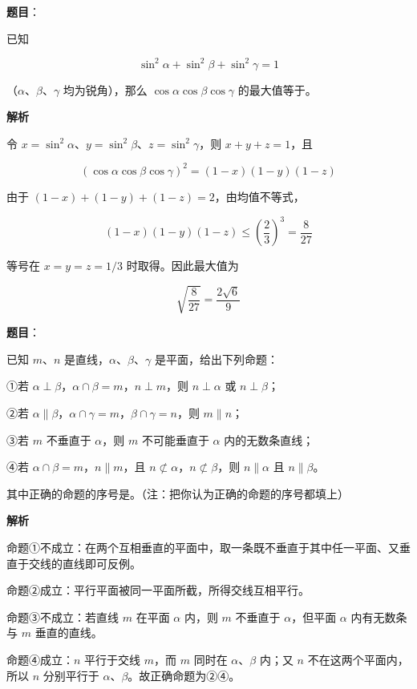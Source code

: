\begin{answer}

\textbf{题目}：

已知

\nopagebreak[4]
\[
\sin^2\alpha+\sin^2\beta+\sin^2\gamma=1
\]

（$\alpha\text{、}\beta\text{、}\gamma$ 均为锐角），那么 $\cos\alpha\cos\beta\cos\gamma$ 的最大值等于\gkblank{}。

\textbf{解析}

令 $x=\sin^2\alpha$、$y=\sin^2\beta$、$z=\sin^2\gamma$，则 $x+y+z=1$，且

\nopagebreak[4]
\[
(\cos\alpha\cos\beta\cos\gamma)^2=(1-x)(1-y)(1-z)
\]

由于 $(1-x)+(1-y)+(1-z)=2$，由均值不等式，

\nopagebreak[4]
\[
(1-x)(1-y)(1-z)\le\left(\frac23\right)^3=\frac8{27}
\]

等号在 $x=y=z=1/3$ 时取得。因此最大值为

\nopagebreak[4]
\[
\sqrt{\frac8{27}}=\frac{2\sqrt6}{9}
\]


\end{answer}
\begin{answer}

\textbf{题目}：

已知 $m\text{、}n$ 是直线，$\alpha\text{、}\beta\text{、}\gamma$ 是平面，给出下列命题：

①若 $\alpha\perp\beta$，$\alpha\cap\beta=m$，$n\perp m$，则 $n\perp\alpha$ 或 $n\perp\beta$；

②若 $\alpha\parallel\beta$，$\alpha\cap\gamma=m$，$\beta\cap\gamma=n$，则 $m\parallel n$；

③若 $m$ 不垂直于 $\alpha$，则 $m$ 不可能垂直于 $\alpha$ 内的无数条直线；

④若 $\alpha\cap\beta=m$，$n\parallel m$，且 $n\not\subset\alpha$，$n\not\subset\beta$，则 $n\parallel\alpha$ 且 $n\parallel\beta$。

其中正确的命题的序号是\gkblank{}。（注：把你认为正确的命题的序号都填上）

\textbf{解析}

命题①不成立：在两个互相垂直的平面中，取一条既不垂直于其中任一平面、又垂直于交线的直线即可反例。

命题②成立：平行平面被同一平面所截，所得交线互相平行。

命题③不成立：若直线 $m$ 在平面 $\alpha$ 内，则 $m$ 不垂直于 $\alpha$，但平面 $\alpha$ 内有无数条与 $m$ 垂直的直线。

命题④成立：$n$ 平行于交线 $m$，而 $m$ 同时在 $\alpha\text{、}\beta$ 内；又 $n$ 不在这两个平面内，所以 $n$ 分别平行于 $\alpha\text{、}\beta$。故正确命题为②④。


\end{answer}


